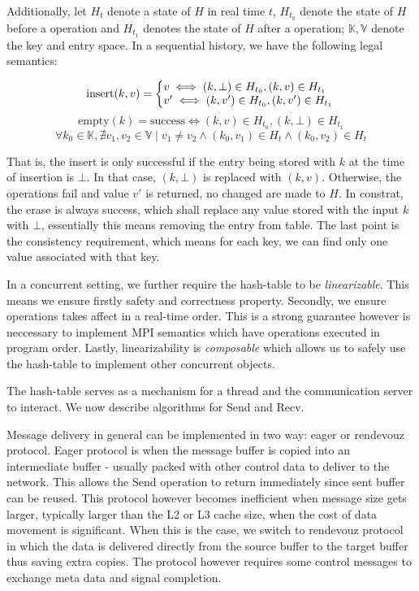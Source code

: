 \documentclass[11pt]{article}
\begin{document}
Additionally, let $H_t$ denote a state of $H$ in real time $t$, $H_{t_0}$ denote the
state of $H$ before a operation and $H_{t_1}$ denotes the state of $H$ after a
operation; $\mathbb{K}, \mathbb{V}$ denote the key and entry space. In a
sequential history, we have the following legal semantics:

\[
  \text{insert}(k, v) = \left\{
    \begin{array}{@{}l@{\thinspace}l}
      v \iff (k,\bot) \in H_{t_0}, (k,v) \in H_{t_1}\\
      v' \iff (k,v') \in H_{t_0}, (k,v') \in H_{t_1}
    \end{array}
    \right.
\]
\[
  \text{empty}(k) = \text{success} \iff  (k,v) \in H_{t_0}, (k,\bot) \in H_{t_1}
\]
\[
  \forall k_0 \in \mathbb{K}, \nexists {v_1, v_2 \in \mathbb{V}}
    \mid {{v_1 \ne v_2} \wedge {(k_0, v_1) \in H_{t} \wedge (k_0, v_2) \in H_{t}}}
\]

That is, the insert is only successful if the entry being stored with $k$ at
the time of insertion is $\bot$.  In that case, $(k,\bot)$ is replaced with
$(k, v)$. Otherwise, the operations fail and value $v'$ is returned, no changed
are made to $H$. In constrat, the erase is always success, which shall replace
any value stored with the input $k$ with $\bot$, essentially this means
removing the entry from table.  The last point is the consistency requirement,
which means for each key, we can find only one value associated with that key.

In a concurrent setting, we further require the hash-table to be
\textit{linearizable}.  This means we ensure firstly safety and correctness
property. Secondly, we ensure operations takes affect in a real-time order.
This is a strong guarantee however is neccessary to implement MPI semantics
which have operations executed in program order. Lastly, linearizability is 
\textit{composable} which allows us to safely use the hash-table to implement
other concurrent objects.

The hash-table serves as a mechanism for a thread and the communication server
to interact. We now describe algorithms for Send and Recv.

Message delivery in general can be implemented in two way: eager or rendevouz
protocol. Eager protocol is when the message buffer is copied into an
intermediate buffer - usually packed with other control data to deliver to the
network. This allows the Send operation to return immediately since sent buffer
can be reused.  This protocol however becomes inefficient when message size
gets larger, typically larger than the L2 or L3 cache size, when the cost of
data movement is significant.  When this is the case, we switch to rendevouz
protocol in which the data is delivered directly from the source buffer to the
target buffer thus saving extra copies.  The protocol however requires
some control messages to exchange meta data and signal completion.
\end{document}

